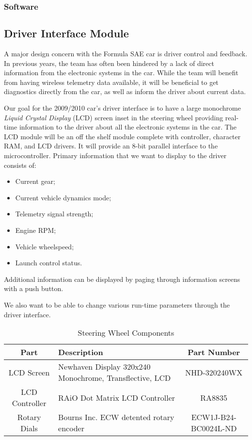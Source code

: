 \subsubsection{Software}

%
%

\subsection{Driver Interface Module}

A major design concern with the Formula SAE car is driver control and feedback. In previous years, the team has often been hindered by a lack of direct information from the electronic systems in the car. While the team will benefit from having wireless telemetry data available, it will be beneficial to get diagnostics directly from the car, as well as inform the driver about current data.

Our goal for the 2009/2010 car's driver interface is to have a large monochrome \emph{Liquid Crystal Display} (LCD) screen inset in the steering wheel providing real-time information to the driver about all the electronic systems in the car. The LCD module will be an off the shelf module complete with controller, character RAM, and LCD drivers. It will provide an 8-bit parallel interface to the microcontroller. Primary information that we want to display to the driver consists of:
\begin{itemize}
\item Current gear;
\item Current vehicle dynamics mode;
\item Telemetry signal strength;
\item Engine RPM;
\item Vehicle wheelspeed;
\item Launch control status.
\end{itemize}
Additional information can be displayed by paging through information screens with a push button.

We also want to be able to change various run-time parameters through the driver interface.

\begin{table}[H]
\caption{Steering Wheel Components\label{tab:Steering-Wheel-Components}}

\centering{}\begin{tabular}{|c|>{\centering}p{15em}|c|}
\hline 
Part & Description & Part Number\tabularnewline
\hline
\hline 
LCD Screen & Newhaven Display 320x240 Monochrome, Transflective, LCD & NHD-320240WX\tabularnewline
\hline 
LCD Controller & RAiO Dot Matrix LCD Controller & RA8835\tabularnewline
\hline 
Rotary Dials & Bourns Inc. ECW detented rotary encoder & ECW1J-B24-BC0024L-ND\tabularnewline
\hline
\end{tabular}
\end{table}

